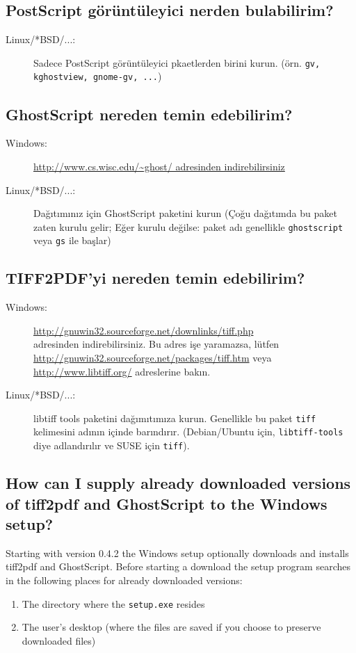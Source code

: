 \documentclass[a4paper,10pt]{scrartcl}
\begin{document}
\subsection{PostScript görüntüleyici nerden bulabilirim?}
\begin{description}
\item[Linux/*BSD/...:] Sadece PostScript görüntüleyici pkaetlerden birini kurun.
		(örn. \texttt{gv, kghostview, gnome-gv, ...})


\end{description}

\subsection{GhostScript nereden temin edebilirim?}
\begin{description}
\item[Windows:] \url{http://www.cs.wisc.edu/~ghost/ adresinden indirebilirsiniz}
\item[Linux/*BSD/...:] Dağıtımınız için GhostScript paketini kurun (Çoğu dağıtımda bu paket zaten kurulu gelir; Eğer kurulu değilse: paket adı genellikle \texttt{ghostscript} veya \texttt{gs} ile başlar)
\end{description}

\subsection{TIFF2PDF'yi nereden temin edebilirim?}
\begin{description}
\item[Windows:] \url{http://gnuwin32.sourceforge.net/downlinks/tiff.php}\\ adresinden indirebilirsiniz. Bu adres işe yaramazsa, lütfen \url{http://gnuwin32.sourceforge.net/packages/tiff.htm} veya \url{http://www.libtiff.org/} adreslerine bakın.
\item[Linux/*BSD/...:] libtiff tools paketini dağımıtımıza kurun. Genellikle bu paket \texttt{tiff} kelimesini adının içinde barındırır. (Debian/Ubuntu için, \texttt{libtiff-tools} diye adlandırılır ve SUSE için \texttt{tiff}).
\end{description}

\subsection{How can I supply already downloaded versions of tiff2pdf and GhostScript to the Windows setup?}

Starting with version 0.4.2 the Windows setup optionally downloads and installs tiff2pdf and GhostScript.
Before starting a download the setup program searches in the following places for already downloaded versions:
\begin{enumerate}
 \item The directory where the \texttt{setup.exe} resides
 \item The user's desktop (where the files are saved if you choose to preserve downloaded files)
\end{enumerate}
\end{document}
